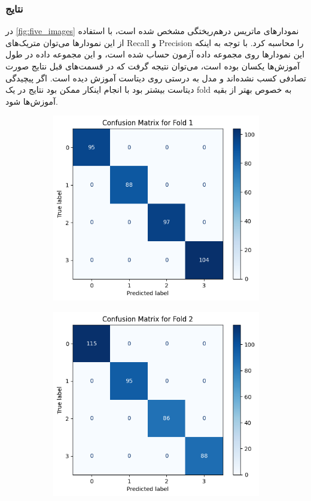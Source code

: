\documentclass{article}
\begin{document}
\subsubsection{نتایج}
در 
\autoref{fig:five_images}
نمودارهای ماتریس درهم‌ریختگی مشخص شده است، با استفاده از این نمودارها می‌توان متریک‌های 
Recall و Precision
را محاسبه کرد. با توجه به اینکه این نمودارها روی مجموعه داده آزمون حساب شده است، و این مجموعه داده در طول آموزش‌ها یکسان بوده است، می‌توان نتیجه گرفت که در قسمت‌های قبل نتایج صورت تصادفی کسب نشده‌اند و مدل به درستی روی دیتاست آموزش دیده است. اگر پیچیدگی دیتاست بیشتر بود با انجام اینکار ممکن بود نتایج در یک 
fold
به خصوص بهتر از بقیه آموزش‌ها شود.
\begin{figure}[H]
    \centering
    \begin{subfigure}[b]{0.33\textwidth}
        \centering
        \includegraphics[width=\textwidth]{img/Q2/f1.png}
        \label{fig:image1}
    \end{subfigure}
    \hfill
    \begin{subfigure}[b]{0.32\textwidth}
        \centering
        \includegraphics[width=\textwidth]{img/Q2/f2.png}

\end{subfigure}
\end{figure}
\end{document}
